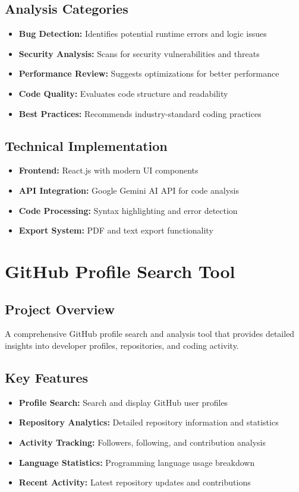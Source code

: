 \documentclass[11pt,a4paper]{article}
\begin{document}
\subsection{Analysis Categories}
\begin{itemize}[leftmargin=1.5cm]
\item \textbf{Bug Detection:} Identifies potential runtime errors and logic issues
\item \textbf{Security Analysis:} Scans for security vulnerabilities and threats
\item \textbf{Performance Review:} Suggests optimizations for better performance
\item \textbf{Code Quality:} Evaluates code structure and readability
\item \textbf{Best Practices:} Recommends industry-standard coding practices
\end{itemize}

\subsection{Technical Implementation}
\begin{itemize}[leftmargin=1.5cm]
\item \textbf{Frontend:} React.js with modern UI components
\item \textbf{API Integration:} Google Gemini AI API for code analysis
\item \textbf{Code Processing:} Syntax highlighting and error detection
\item \textbf{Export System:} PDF and text export functionality
\end{itemize}

\newpage

\section{GitHub Profile Search Tool}

\subsection{Project Overview}
A comprehensive GitHub profile search and analysis tool that provides detailed insights into developer profiles, repositories, and coding activity.

\subsection{Key Features}
\begin{itemize}[leftmargin=1.5cm]
\item \textbf{Profile Search:} Search and display GitHub user profiles
\item \textbf{Repository Analytics:} Detailed repository information and statistics
\item \textbf{Activity Tracking:} Followers, following, and contribution analysis
\item \textbf{Language Statistics:} Programming language usage breakdown
\item \textbf{Recent Activity:} Latest repository updates and contributions
\end{itemize}
\end{document}
